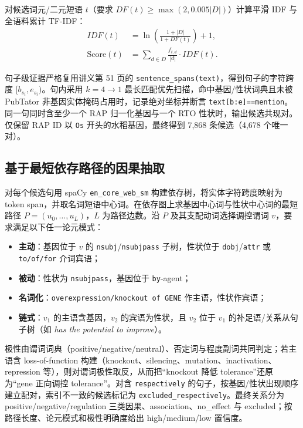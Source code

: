 \documentclass[conference]{IEEEtran}
\begin{document}
对候选词元/二元短语 $t$（要求 $DF(t)\ge\max(2,0.005|D|)$）计算平滑 IDF 与全语料累计 TF-IDF：
\begin{equation}
\begin{aligned}
IDF(t) &= \ln\!\left(\frac{1+|D|}{1+DF(t)}\right)+1,\\
\text{Score}(t) &= \sum_{d\in D}\frac{f_{t,d}}{|d|}\cdot IDF(t).
\end{aligned}
\label{eq:tfidf}
\end{equation}

句子级证据严格复用讲义第 51 页的 \texttt{sentence\_spans(text)}，得到句子的字符跨度 $[b_{s_i},e_{s_i})$。句内采用 $k=4\to1$ 最长匹配优先扫描，命中基因/性状词典且未被 PubTator 非基因实体掩码占用时，记录绝对坐标并断言 \texttt{text[b:e]==mention}。同一句同时含至少一个 RAP 归一化基因与一个 RTO 性状时，输出候选共现对。仅保留 RAP ID 以 \texttt{Os} 开头的水稻基因，最终得到 7,868 条候选（4,678 个唯一对）。

\subsection{基于最短依存路径的因果抽取}
对每个候选句用 spaCy \texttt{en\_core\_web\_sm} 构建依存树，将实体字符跨度映射为 token span，并取名词短语中心词。在依存图上求基因中心词与性状中心词的最短路径 $P=(u_0,\dots,u_L)$，$L$ 为路径边数。沿 $P$ 及其支配动词选择调控谓词 $v$，要求满足以下任一论元模式：
\begin{itemize}\setlength{\itemsep}{0pt}\setlength{\parsep}{0pt}\setlength{\topsep}{0.5pt}
  \item \textbf{主动}：基因位于 $v$ 的 \texttt{nsubj}/\texttt{nsubjpass} 子树，性状位于 \texttt{dobj}/\texttt{attr} 或 \texttt{to/of/for} 介词宾语；
  \item \textbf{被动}：性状为 \texttt{nsubjpass}，基因位于 \texttt{by}-agent；
  \item \textbf{名词化}：\texttt{overexpression/knockout of GENE} 作主语，性状作宾语；
  \item \textbf{链式}：$v_1$ 的主语含基因，$v_2$ 的宾语为性状，且 $v_2$ 位于 $v_1$ 的补足语/关系从句子树（如 \textit{has the potential to improve}）。
\end{itemize}

极性由谓词词典（positive/negative/neutral）、否定词与程度副词共同判定；若主语含 loss-of-function 构建（knockout、silencing、mutation、inactivation、repression 等），则对谓词极性取反，从而把“knockout 降低 tolerance”还原为“gene 正向调控 tolerance”。对含 \texttt{respectively} 的句子，按基因/性状出现顺序建立配对，索引不一致的候选标记为 \texttt{excluded\_respectively}。最终关系分为 positive/negative/regulation 三类因果、association、no\_effect 与 excluded；按路径长度、论元模式和极性明确度给出 high/medium/low 置信度。
\end{document}

